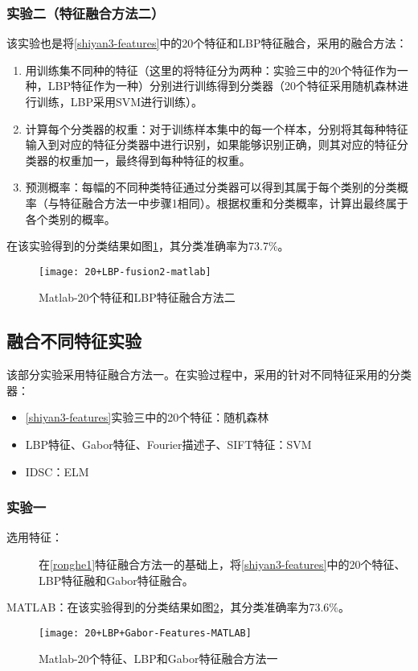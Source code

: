 \subsubsection{实验二（特征融合方法二）}
该实验也是将\ref{shiyan3-features}中的20个特征和LBP特征融合，采用的融合方法：
\begin{enumerate}
\item 用训练集不同种的特征（这里的将特征分为两种：实验三中的20个特征作为一种，LBP特征作为一种）分别进行训练得到分类器（20个特征采用随机森林进行训练，LBP采用SVM进行训练）。
\item 计算每个分类器的权重：对于训练样本集中的每一个样本，分别将其每种特征输入到对应的特征分类器中进行识别，如果能够识别正确，则其对应的特征分类器的权重加一，最终得到每种特征的权重。
\item 预测概率：每幅的不同种类特征通过分类器可以得到其属于每个类别的分类概率（与特征融合方法一中步骤1相同）。根据权重和分类概率，计算出最终属于各个类别的概率。
\end{enumerate}

在该实验得到的分类结果如图\ref{fig:20+LBP-fusion2-matlab}，其分类准确率为73.7\%。
\begin{figure}[!ht]
\centering
\texttt{[image: 20+LBP-fusion2-matlab]}
\caption{Matlab-20个特征和LBP特征融合方法二}
\label{fig:20+LBP-fusion2-matlab}
\end{figure}

\subsection{融合不同特征实验}
该部分实验采用特征融合方法一。在实验过程中，采用的针对不同特征采用的分类器：
\begin{itemize}
\item \ref{shiyan3-features}实验三中的20个特征：随机森林
\item LBP特征、Gabor特征、Fourier描述子、SIFT特征：SVM
\item IDSC：ELM
\end{itemize}
\subsubsection{实验一}
\begin{description}
\item[选用特征：] 在\ref{ronghe1}特征融合方法一的基础上，将\ref{shiyan3-features}中的20个特征、LBP特征融和Gabor特征融合。
\end{description}
MATLAB：在该实验得到的分类结果如图\ref{fig:20+LBP+Gabor-Features-MATLAB}，其分类准确率为73.6\%。
\begin{figure}[!ht]
\centering
\texttt{[image: 20+LBP+Gabor-Features-MATLAB]}
\caption{Matlab-20个特征、LBP和Gabor特征融合方法一}
\label{fig:20+LBP+Gabor-Features-MATLAB}
\end{figure}

